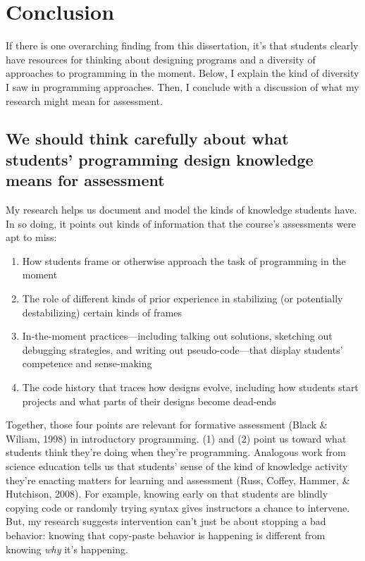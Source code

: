 \section{Conclusion}\label{conclusion-1}

If there is one overarching finding from this dissertation, it's that students clearly have resources for thinking about designing programs and a diversity of approaches to programming in the moment. Below, I explain the kind of diversity I saw in programming approaches. Then, I conclude with a discussion of what my research might mean for assessment.

\subsection{We should think carefully about what students' programming design knowledge means for assessment}\label{we-should-think-carefully-about-what-students-programming-design-knowledge-means-for-assessment}

My research helps us document and model the kinds of knowledge students have. In so doing, it points out kinds of information that the course's assessments were apt to miss:

\begin{enumerate}
\def\labelenumi{\arabic{enumi}.}
\item
  How students frame or otherwise approach the task of programming in the moment
\item
  The role of different kinds of prior experience in stabilizing (or potentially destabilizing) certain kinds of frames
\item
  In-the-moment practices---including talking out solutions, sketching out debugging strategies, and writing out pseudo-code---that display students' competence and sense-making
\item
  The code history that traces how designs evolve, including how students start projects and what parts of their designs become dead-ends
\end{enumerate}

Together, those four points are relevant for formative assessment (Black \& Wiliam, 1998) in introductory programming. (1) and (2) point us toward what students think they're doing when they're programming. Analogous work from science education tells us that students' sense of the kind of knowledge activity they're enacting matters for learning and assessment (Russ, Coffey, Hammer, \& Hutchison, 2008). For example, knowing early on that students are blindly copying code or randomly trying syntax gives instructors a chance to intervene. But, my research suggests intervention can't just be about stopping a bad behavior: knowing that copy-paste behavior is happening is different from knowing \emph{why} it's happening.

